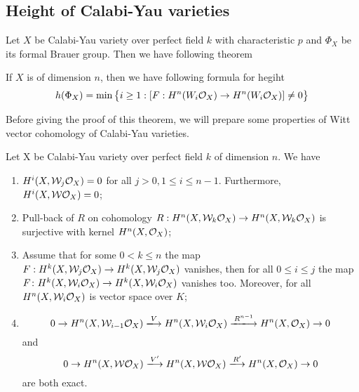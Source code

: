 \documentclass[11pt,a4paper]{scmsnotes}
\begin{document}
\subsection{Height of Calabi-Yau varieties}
Let $X$ be Calabi-Yau variety over perfect field $k$ with characteristic $p$ and $\Phi_X$ be its formal Brauer group. Then we have following theorem 
\begin{secthm}\label{thm2.5}
If $X$ is of dimension $n$, then we have following formula for hegiht
\begin{equation}
h(\Phi_X) = \min \big\{ i \geq 1 : [F: H^n(W_i \mathcal{O}_{X}) \to H^n(W_i \mathcal{O}_{X})] \neq 0 \big\}
\end{equation}
\end{secthm}
Before giving the proof of this theorem, we will prepare some properties of Witt vector cohomology of Calabi-Yau varieties.
\begin{secprop}
	Let X be Calabi-Yau variety over perfect field $k$ of dimension $n$. We have
	\begin{enumerate}
		\item $H^i(X, \mathcal{W}_j\mathcal{O}_{X}) =0$ for all $j > 0, 1 \leq i \leq n-1$. Furthermore, $H^i(X, \mathcal{W}\mathcal{O}_{X})=0$;
		\item Pull-back of $R$ on cohomology $R: H^n(X,\mathcal{W}_k \mathcal{O}_{X}) \to H^n(X,\mathcal{W}_k \mathcal{O}_{X})$ is surjective with kernel $H^n(X,\mathcal{O}_{X})$;
		\item Assume that for some $0<k \leq n$ the map $F: H^k(X,\mathcal{W}_j \mathcal{O}_{X}) \to H^k(X,\mathcal{W}_j \mathcal{O}_{X})$ vanishes, then for all $0 \leq i \leq j$ the map $F \colon H^k(X,\mathcal{W}_i \mathcal{O}_{X}) \to H^k(X,\mathcal{W}_i \mathcal{O}_{X})$ vanishes too. Moreover, for all $H^n(X,\mathcal{W}_i \mathcal{O}_{X})$ is vector space over $K$;
		\item 
		\[
		0 \to H^n(X, \mathcal{W}_{i-1}\sheaf{X}) \xlongrightarrow{V} H^n(X,\mathcal{W}_i \sheaf{X})\xlongrightarrow{R^{n-1}} H^n(X,\sheaf{X}) \to 0
		\]
		and
		\[
		0 \to H^n(X,\mathcal{W} \sheaf{X}) \xlongrightarrow{V'} H^n(X,\mathcal{W}\sheaf{X}) \xlongrightarrow{R'} H^n(X,\sheaf{X}) \to 0
		\]
		are both exact.
	\end{enumerate}
\end{secprop}
\end{document}
